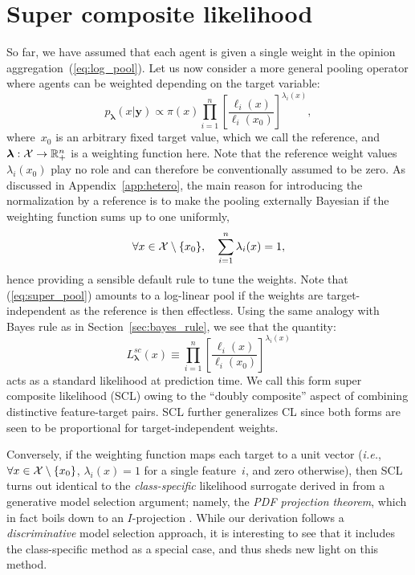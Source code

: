 \documentclass[english]{scrartcl}
\def\y{{\mathbf{y}}}
\newcommand{\blambda}{{\boldsymbol{\lambda}}}
\begin{document}
\section{Super composite likelihood}
\label{sec:super}

So far, we have assumed that each agent is given a single weight in the opinion aggregation~(\ref{eq:log_pool}). Let us now consider a more general pooling operator where agents can be weighted depending on the target variable:
\begin{equation}
\label{eq:super_pool}
p_\blambda(x|\y) \propto \pi(x) \prod_{i=1}^n \left[\frac{\ell_i(x)}{\ell_i(x_0)}\right]^{\lambda_i(x)},    
\end{equation}
where~$x_0$ is an arbitrary fixed target value, which we call the reference, and $\blambda: {\cal X}\to \mathbb{R}_+^n$ is a weighting function here. Note that the reference weight values $\lambda_i(x_0)$ play no role and can therefore be conventionally assumed to be zero. As discussed in Appendix~\ref{app:hetero}, the main reason for introducing the normalization by a reference is to make the pooling externally Bayesian if the weighting function sums up to one uniformly,
$$
\forall x\in{\cal X}\setminus \{x_0\},\quad
\sum_{i=1}^n \lambda_i(x) = 1,
$$
hence providing a sensible default rule to tune the weights. Note that (\ref{eq:super_pool}) amounts to a log-linear pool if the weights are target-independent as the reference is then effectless. Using the same analogy with Bayes rule as in Section~\ref{sec:bayes_rule}, we see that the quantity:
\begin{equation}
\label{eq:super_comp_lik}
L^{sc}_\blambda(x) \equiv 
\prod_{i=1}^n \left[\frac{\ell_i(x)}{\ell_i(x_0)}\right]^{\lambda_i(x)}
\end{equation} 
acts as a standard likelihood at prediction time. We call this form super composite likelihood (SCL) owing to the ``doubly composite'' aspect of combining distinctive feature-target pairs. SCL further generalizes CL since both forms are seen to be proportional for target-independent weights. 

Conversely, if the weighting function maps each target to a unit vector ({\em i.e.}, $\forall x\in{\cal X}\setminus \{x_0\}$, $\lambda_i(x)=1$ for a single feature~$i$, and zero otherwise), then SCL turns out identical to the {\em class-specific} likelihood surrogate derived in \cite{Baggenstoss-03} from a generative model selection argument; namely, the {\em PDF projection theorem}, which in fact boils down to an $I$-projection \cite{Minka-04}. While our derivation follows a {\em discriminative} model selection approach, it is interesting to see that it includes the class-specific method as a special case, and thus sheds new light on this method.
\end{document}
